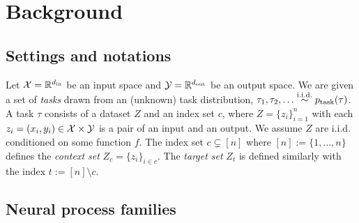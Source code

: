 \section{Background}
\label{main:sec:background}
\subsection{Settings and notations}

Let ${\mathcal{X}} = \mathbb{R}^{{d_{\text{in}}}}$ be an input space and ${\mathcal{Y}} = \mathbb{R}^{d_{\text{out}}}$ be an output space. 
We are given a set of \emph{tasks} drawn from an (unknown) task distribution, $\tau_1, \tau_2, \dots \overset{\mathrm{i.i.d.}}{\sim} p_\text{task}(\tau)$. 
A task $\tau$ consists of a dataset $Z$ and an index set $c$, where $Z = \{z_i\}_{i=1}^n$ with each $z_i = (x_i, y_i) \in {\mathcal{X}} \times {\mathcal{Y}}$ is a pair of an input and an output. We assume $Z$ are i.i.d. conditioned on some function $f$. The index set $c \subsetneq [n]$ where $[n] := \{1,\dots, n\}$ defines the \emph{context set} $Z_c = \{z_i\}_{i\in c}$. The \emph{target set} $Z_t$ is defined similarly with the index $t := [n]\setminus c$.


\subsection{Neural process families}


